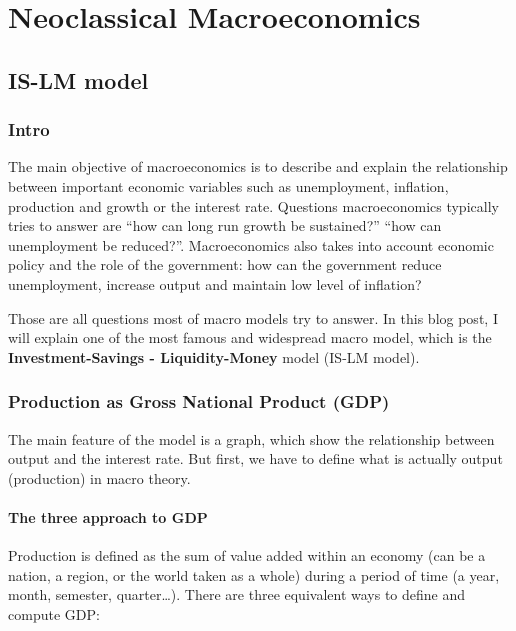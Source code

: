 \documentclass[
  letterpaper,
  DIV=11,
  numbers=noendperiod]{scrreprt}
\begin{document}
\part{Neoclassical Macroeconomics}

\hypertarget{is-lm-model}{%
\chapter{IS-LM model}\label{is-lm-model}}

\hypertarget{intro-1}{%
\section{Intro}\label{intro-1}}

The main objective of macroeconomics is to describe and explain the
relationship between important economic variables such as unemployment,
inflation, production and growth or the interest rate. Questions
macroeconomics typically tries to answer are ``how can long run growth
be sustained?'' ``how can unemployment be reduced?''. Macroeconomics
also takes into account economic policy and the role of the government:
how can the government reduce unemployment, increase output and maintain
low level of inflation?

Those are all questions most of macro models try to answer. In this blog
post, I will explain one of the most famous and widespread macro model,
which is the \textbf{Investment-Savings - Liquidity-Money} model (IS-LM
model).

\hypertarget{production-as-gross-national-product-gdp}{%
\section{Production as Gross National Product
(GDP)}\label{production-as-gross-national-product-gdp}}

The main feature of the model is a graph, which show the relationship
between output and the interest rate. But first, we have to define what
is actually output (production) in macro theory.

\hypertarget{the-three-approach-to-gdp}{%
\subsection{The three approach to GDP}\label{the-three-approach-to-gdp}}

Production is defined as the sum of value added within an economy (can
be a nation, a region, or the world taken as a whole) during a period of
time (a year, month, semester, quarter\ldots). There are three
equivalent ways to define and compute GDP:
\end{document}
